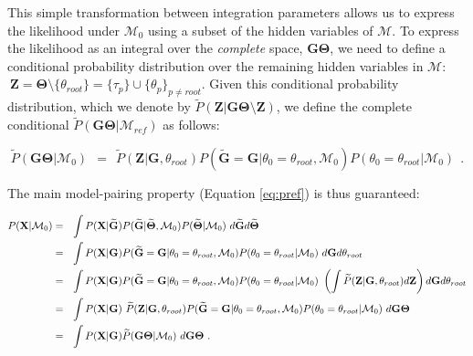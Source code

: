 \documentclass[11pt]{article}
\newcommand{\vect}[1]{\boldsymbol{\mathbf{#1}}}
\newcommand{\X}{\vect{X}}
\newcommand{\M}{\mathcal{M}}
\newcommand{\G}{\vect{G}}
\newcommand{\T}{\vect{\Theta}}
\newcommand{\GT}{\G\T}
\newcommand{\Mref}{\M_{ref}}
\newcommand{\Pref}{\widetilde{P}}
\newcommand{\Gref}{\widetilde{\G}}
\newcommand{\Tref}{\widetilde{\T}}
\newcommand{\Z}{\vect{Z}}
\newcommand{\troot}{\theta_{root}}
\begin{document}
This simple transformation between integration parameters allows us to express the likelihood under $\M_0$
using a subset of the hidden variables of $\M$.
%
To express the likelihood as an integral over the {\em complete} space, $\GT$, we need to define a
conditional probability distribution over the remaining hidden variables in $\M$:
$~ \Z=\T\setminus \{\troot\} = \{\tau_p\}\cup\{\theta_p\}_{p\neq root}$.
%
Given this conditional probability distribution, which we denote by $\Pref(\Z|\GT\setminus\Z)$, we define the
complete conditional $\Pref(\GT|\Mref)$ as follows:
%
%
\begin{small}
\begin{equation}
 \Pref(\GT|\M_0)  ~~=~~
 \Pref(\Z|\G,\troot) P(\Gref=\G|\theta_0=\troot,\M_0) P(\theta_0=\troot|\M_0)\ ~ .\label{eq:pref_null}
\end{equation}
\end{small}
%
%
The main model-pairing property (Equation \ref{eq:pref}) is thus guaranteed:
%
%
\begin{small}
\begin{align}
P(\X|\M_0)
&=~~ \int P(\X|\Gref) P(\Gref|\Tref,\M_0) P(\Tref|\M_0)\ d\Gref d\Tref  \notag \\ %
&=~~ \int P(\X|\G) P(\Gref=\G|\theta_0=\troot,\M_0) P(\theta_0=\troot|\M_0)\ d\G d\troot \notag \\ 
&=~~ \int P(\X|\G) P(\Gref=\G|\theta_0=\troot,\M_0) P(\theta_0=\troot|\M_0)\ 
\left( \int \Pref(\Z|\G,\troot)d\Z\right)d\G d\troot \notag \\ 
%
&=~~ \int P(\X|\G)\ \Pref(\Z|\G,\troot) P(\Gref=\G|\theta_0=\troot,\M_0) P(\theta_0=\troot|\M_0)\ d\GT \notag \\ 
&=~~ \int P(\X|\G) \Pref(\GT|\M_0)\ d\GT ~. \label{eq:likelihood_null} %
\end{align}
\end{small}

\end{document}
